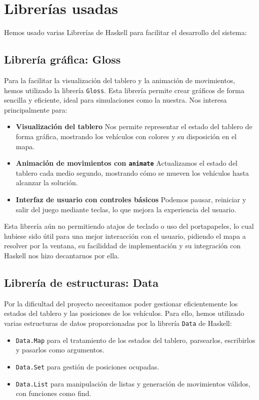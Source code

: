 \documentclass{article}
\begin{document}
\section*{Librerías usadas}
Hemos usado varias Librerías de Haskell para facilitar el desarrollo del sistema:
\subsection{Librería gráfica: Gloss}
Para la facilitar la visualización del tablero y la animación de movimientos, hemos utilizado la librería \texttt{Gloss}. Esta librería permite crear gráficos de forma sencilla y eficiente, ideal para simulaciones como la nuestra. Nos interesa principalmente para:
\begin{itemize}
\item \textbf{Visualización del tablero} Nos permite representar el estado del tablero de forma gráfica, mostrando los vehículos con colores y su disposición en el mapa.
\item \textbf{Animación de movimientos con \texttt{animate}} Actualizamos el estado del tablero cada medio segundo, mostrando cómo se mueven los vehículos hasta alcanzar la solución.
\item \textbf{Interfaz de usuario con controles básicos} Podemos pausar, reiniciar y salir del juego mediante teclas, lo que mejora la experiencia del usuario.
\end{itemize}
Esta librería aún no permitiendo atajos de teclado o uso del portapapeles, lo cual hubiese sido útil para una mejor interacción con el usuario, pidiendo el mapa a resolver por la ventana, su faciliddad de implementación y su integración con Haskell nos hizo decantarnos por ella.

\subsection{Librería de estructuras: Data}
Por la dificultad del proyecto necesitamos poder gestionar eficientemente los estados del tablero y las posiciones de los vehículos. Para ello, hemos utilizado varias estructuras de datos proporcionadas por la librería \texttt{Data} de Haskell:
\begin{itemize}
\item \texttt{Data.Map} para el tratamiento de los estados del tablero, parsearlos, escribirlos y pasarlos como argumentos.
\item \texttt{Data.Set} para gestión de posiciones ocupadas.
\item \texttt{Data.List} para manipulación de listas y generación de movimientos válidos, con funciones como find.
\end{itemize}
\end{document}
